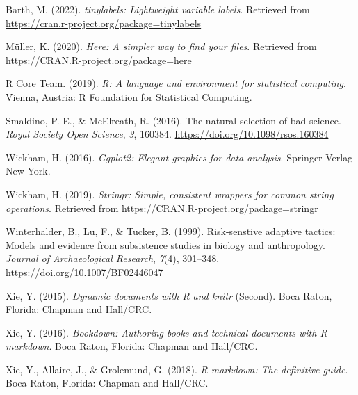 \documentclass[british,,man,floatsintext]{apa6}
\begin{document}
\leavevmode\hypertarget{ref-R-tinylabels}{}%
Barth, M. (2022). \emph{tinylabels: Lightweight variable labels}. Retrieved from \url{https://cran.r-project.org/package=tinylabels}

\leavevmode\hypertarget{ref-R-here}{}%
Müller, K. (2020). \emph{Here: A simpler way to find your files}. Retrieved from \url{https://CRAN.R-project.org/package=here}

\leavevmode\hypertarget{ref-R-base}{}%
R Core Team. (2019). \emph{R: A language and environment for statistical computing}. Vienna, Austria: R Foundation for Statistical Computing.

\leavevmode\hypertarget{ref-Smaldino2016}{}%
Smaldino, P. E., \& McElreath, R. (2016). The natural selection of bad science. \emph{Royal Society Open Science}, \emph{3}, 160384. \url{https://doi.org/10.1098/rsos.160384}

\leavevmode\hypertarget{ref-R-ggplot2}{}%
Wickham, H. (2016). \emph{Ggplot2: Elegant graphics for data analysis}. Springer-Verlag New York.

\leavevmode\hypertarget{ref-R-stringr}{}%
Wickham, H. (2019). \emph{Stringr: Simple, consistent wrappers for common string operations}. Retrieved from \url{https://CRAN.R-project.org/package=stringr}

\leavevmode\hypertarget{ref-Winterhalder1999}{}%
Winterhalder, B., Lu, F., \& Tucker, B. (1999). Risk-senstive adaptive tactics: Models and evidence from subsistence studies in biology and anthropology. \emph{Journal of Archaeological Research}, \emph{7}(4), 301--348. \url{https://doi.org/10.1007/BF02446047}

\leavevmode\hypertarget{ref-R-knitr}{}%
Xie, Y. (2015). \emph{Dynamic documents with R and knitr} (Second). Boca Raton, Florida: Chapman and Hall/CRC.

\leavevmode\hypertarget{ref-R-bookdown}{}%
Xie, Y. (2016). \emph{Bookdown: Authoring books and technical documents with R markdown}. Boca Raton, Florida: Chapman and Hall/CRC.

\leavevmode\hypertarget{ref-R-rmarkdown}{}%
Xie, Y., Allaire, J., \& Grolemund, G. (2018). \emph{R markdown: The definitive guide}. Boca Raton, Florida: Chapman and Hall/CRC.
\end{document}
